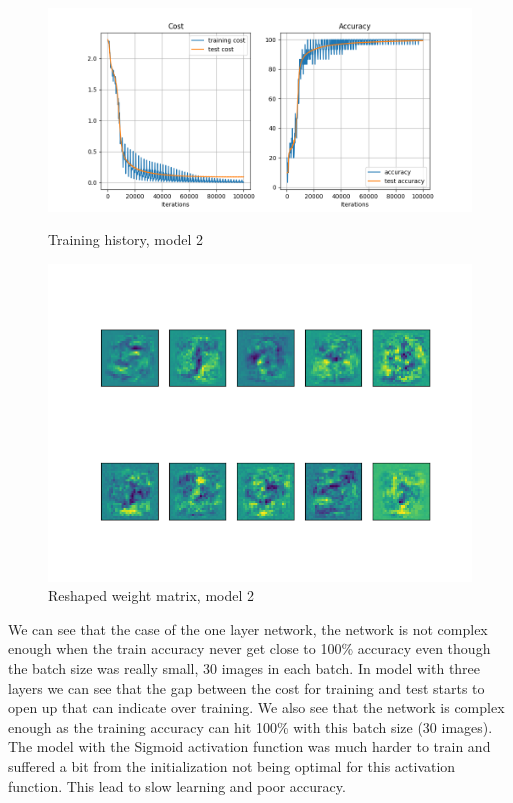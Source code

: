 \documentclass[a4paper,10pt]{article}
\begin{document}
\begin{figure}[h]
\begin{minipage}{0.5\textwidth}
  \centering
  \includegraphics[width=\linewidth]{figures/training_3layer.png}
  \caption{Training history, model 2}
  \label{fig:img1}
\end{minipage}
\begin{minipage}{0.5\textwidth}
  \centering
  \includegraphics[width=\linewidth]{figures/Figure_2.png}
  \caption{Reshaped weight matrix, model 2}
  \label{fig:img2}
\end{minipage}
\end{figure}


We can see that the case of the one layer network, the network is not complex enough when the train accuracy never get close to 100\% accuracy even though the batch size was really small, 30 images in each batch. In model with three layers we can see that the gap between the cost for training and test starts to open up that can indicate over training. We also see that the network is complex enough as the training accuracy can hit 100\% with this batch size (30 images). The model with the Sigmoid activation function was much harder to train and suffered a bit from the initialization not being optimal for this activation function. This lead to slow learning and poor accuracy.
\end{document}
